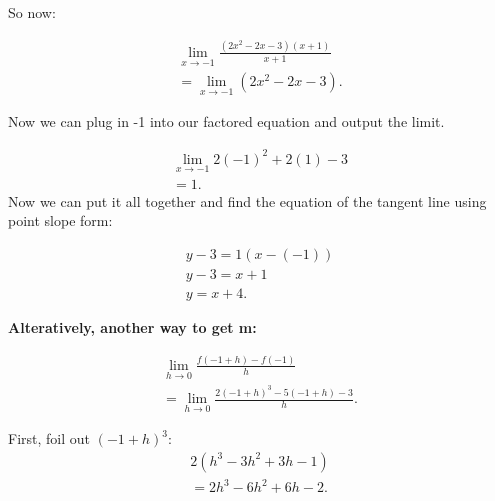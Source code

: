 \documentclass{report}
\begin{document}
        \bigbreak \noindent 
        \begin{center}
            So now:
        \end{center}
        \begin{align*}
            \lim\limits_{x \to -1}{ \frac{ \left(2x^2-2x-3\right) \left(x+1\right)}{x+1}} \\ 
            = \lim\limits_{x \to -1}{ \left(2x^2-2x-3\right)}
        .\end{align*}

        \bigbreak \noindent 
        Now we can plug in -1 into our factored equation and output the limit.

        \begin{align*}
            \lim\limits_{x \to -1}{2 \left(-1\right)^2 + 2 \left(1\right) - 3} \\ 
            = 1
        .\end{align*}
        \bigbreak \noindent 
        Now we can put it all together and find the equation of the tangent line using point slope form:

        \begin{align*}
            y-3 = 1 \left(x- \left(-1\right)\right) \\ 
            y - 3 = x + 1 \\ 
            y = x + 4
        .\end{align*}

        \bigbreak \noindent \bigbreak \noindent 
        \begin{large}
            \textbf{Alteratively, another way to get m:}
        \end{large}

        \begin{align*}
            \lim\limits_{h \to 0}{ \frac{f \left(-1+h\right) - f\left(-1\right)}{h}} \\ 
            = \lim\limits_{h \to 0}{ \frac{2 \left(-1+h\right)^3 - 5 \left(-1+h\right) - 3}{h}}
        .\end{align*}

        \bigbreak \noindent 
        First, foil out $(-1+h)^3$:
        \begin{align*}
            2 \left(h^3 - 3h^2 + 3h -1\right) \\ 
            = 2h^3 - 6h^2 + 6h -2
        .\end{align*}
\end{document}
